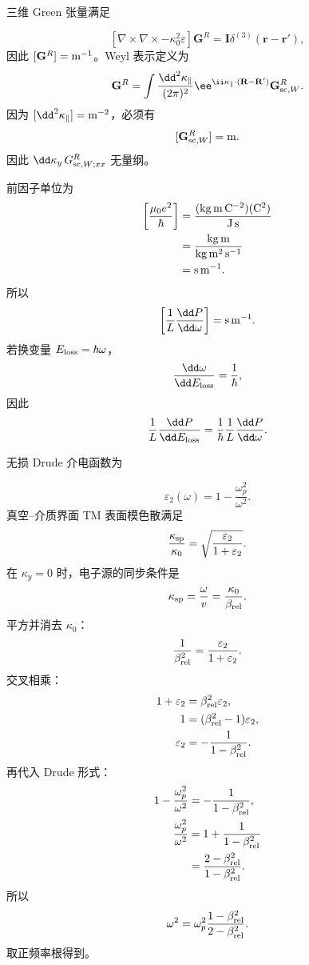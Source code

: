 \begin{derivation}
三维 Green 张量满足

\[
[\nabla\times\nabla\times-\kappa_0^2\varepsilon]\mathbf G^R
=\mathbf I\delta^{(3)}(\mathbf r-\mathbf r'),
\]
因此 $[\mathbf G^R]={\rm m^{-1}}$。Weyl 表示定义为
\[
\mathbf G^R
=\int\frac{\dd^2 \kappa_\parallel}{(2\pi)^2}
\ee^{\ii\mathbf \kappa_\parallel\cdot(\mathbf R-\mathbf R')}
\mathbf G_{{\rm sc},W}^R.
\]
因为 $[\dd^2 \kappa_\parallel]={\rm m^{-2}}$，必须有
\[
[\mathbf G_{{\rm sc},W}^R]={\rm m}.
\]
因此 $\dd \kappa_y\,G_{{\rm sc},W;xx}^R$ 无量纲。

前因子单位为
\begin{align*}
\left[\frac{\mu_0e^2}{\hbar}\right]
&=\frac{({\rm kg\,m\,C^{-2}})({\rm C^2})}
{{\rm J\,s}}\\
&=\frac{{\rm kg\,m}}{{\rm kg\,m^2\,s^{-1}}}\\
&={\rm s\,m^{-1}}.
\end{align*}
所以
\[
\left[\frac1L\frac{\dd P}{\dd\omega}\right]
={\rm s\,m^{-1}}.
\]
若换变量 $E_{\rm loss}=\hbar\omega$，
\[
\frac{\dd\omega}{\dd E_{\rm loss}}=\frac1\hbar,
\]
因此
\[
\frac1L\frac{\dd P}{\dd E_{\rm loss}}
=\frac1\hbar\frac1L\frac{\dd P}{\dd\omega}.
\]
\end{derivation}

\begin{derivation}
无损 Drude 介电函数为

\[
\varepsilon_2(\omega)=1-\frac{\omega_p^2}{\omega^2}.
\]
真空--介质界面 TM 表面模色散满足
\[
\frac{\kappa_{\rm sp}}{\kappa_0}
=\sqrt{\frac{\varepsilon_2}{1+\varepsilon_2}}.
\]
在 $\kappa_y=0$ 时，电子源的同步条件是
\[
\kappa_{\rm sp}=\frac{\omega}{v}
=\frac{\kappa_0}{\beta_{\rm rel}}.
\]
平方并消去 $\kappa_0$：
\[
\frac1{\beta_{\rm rel}^2}
=\frac{\varepsilon_2}{1+\varepsilon_2}.
\]
交叉相乘：
\begin{align*}
1+\varepsilon_2
&=\beta_{\rm rel}^2\varepsilon_2,\\
1
&=(\beta_{\rm rel}^2-1)\varepsilon_2,\\
\varepsilon_2
&=-\frac1{1-\beta_{\rm rel}^2}.
\end{align*}
再代入 Drude 形式：
\begin{align*}
1-\frac{\omega_p^2}{\omega^2}
&=-\frac1{1-\beta_{\rm rel}^2},\\
\frac{\omega_p^2}{\omega^2}
&=1+\frac1{1-\beta_{\rm rel}^2}\\
&=\frac{2-\beta_{\rm rel}^2}{1-\beta_{\rm rel}^2}.
\end{align*}
所以
\[
\omega^2
=\omega_p^2\frac{1-\beta_{\rm rel}^2}{2-\beta_{\rm rel}^2}.
\]
取正频率根得到。
\end{derivation}

